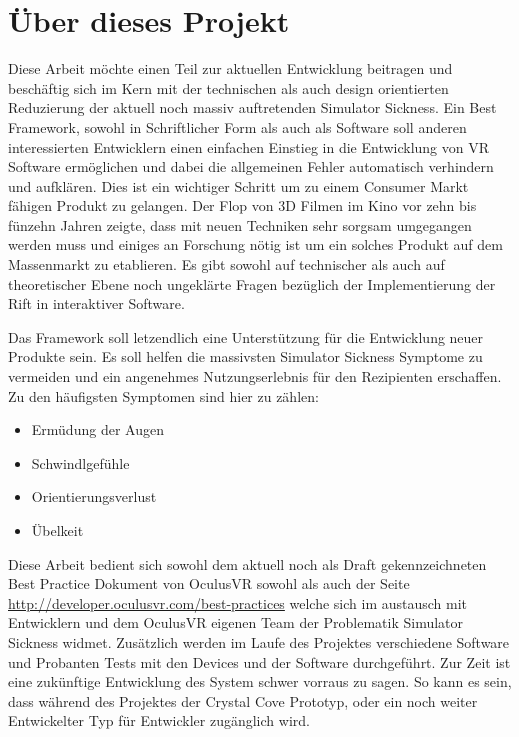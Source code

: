 \documentclass[pagesize, paper=a4, fontsize=12pt,titlepage=true, headings=small, headnosepline, abstractoff, liststotoc, nochapterprefix, plainheadsepline]{scrreprt}
\begin{document}
\section{Über dieses Projekt}
Diese Arbeit möchte einen Teil zur aktuellen Entwicklung beitragen und beschäftig sich im Kern mit der technischen als auch design orientierten Reduzierung der aktuell noch massiv auftretenden Simulator Sickness. Ein Best Framework, sowohl in Schriftlicher Form als auch als Software soll anderen interessierten Entwicklern einen einfachen Einstieg in die Entwicklung von VR Software ermöglichen und dabei die allgemeinen Fehler automatisch verhindern und aufklären. Dies ist ein wichtiger Schritt um zu einem Consumer Markt fähigen Produkt zu gelangen. Der Flop von 3D Filmen im Kino vor zehn bis fünzehn Jahren zeigte, dass mit neuen Techniken sehr sorgsam umgegangen werden muss und einiges an Forschung nötig ist um ein solches Produkt auf dem Massenmarkt zu etablieren. Es gibt sowohl auf technischer als auch auf theoretischer Ebene noch ungeklärte Fragen bezüglich der Implementierung der Rift in interaktiver Software. 

Das Framework soll letzendlich eine Unterstützung für die Entwicklung neuer Produkte sein. Es soll helfen die massivsten Simulator Sickness Symptome zu vermeiden und ein angenehmes Nutzungserlebnis für den Rezipienten erschaffen. Zu den häufigsten Symptomen sind hier zu zählen:
\begin{itemize}
\item Ermüdung der Augen
\item Schwindlgefühle
\item Orientierungsverlust
\item Übelkeit
\end{itemize}

Diese Arbeit bedient sich sowohl dem aktuell noch als Draft gekennzeichneten Best Practice Dokument von OculusVR sowohl als auch der Seite \url{http://developer.oculusvr.com/best-practices} welche sich im austausch mit Entwicklern und dem OculusVR eigenen Team der Problematik Simulator Sickness widmet. Zusätzlich werden im Laufe des Projektes verschiedene Software und Probanten Tests mit den Devices und der Software durchgeführt. Zur Zeit ist eine zukünftige Entwicklung des System schwer vorraus zu sagen. So kann es sein, dass während des Projektes der Crystal Cove Prototyp, oder ein noch weiter Entwickelter Typ für Entwickler zugänglich wird.

\end{document}
